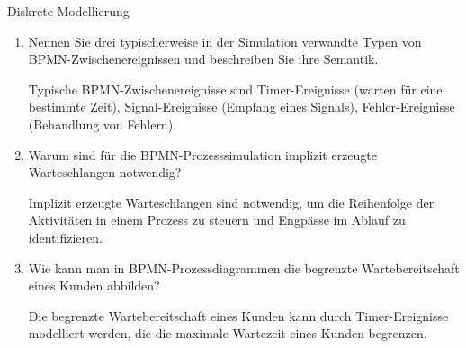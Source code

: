 \documentclass{article}
\begin{document}
\begin{exercise}{Diskrete Modellierung}
\begin{enumerate}
    \item Nennen Sie drei typischerweise in der Simulation verwandte Typen von BPMN-Zwischenereignissen und beschreiben Sie ihre Semantik.
          \begin{solution}
            Typische BPMN-Zwischenereignisse sind Timer-Ereignisse (warten für eine bestimmte Zeit), Signal-Ereignisse (Empfang eines Signals), Fehler-Ereignisse (Behandlung von Fehlern).
          \end{solution}

    \item Warum sind für die BPMN-Prozesssimulation implizit erzeugte Warteschlangen notwendig?
          \begin{solution}
            Implizit erzeugte Warteschlangen sind notwendig, um die Reihenfolge der Aktivitäten in einem Prozess zu steuern und Engpässe im Ablauf zu identifizieren.
          \end{solution}

    \item Wie kann man in BPMN-Prozessdiagrammen die begrenzte Wartebereitschaft eines Kunden abbilden?
          \begin{solution}
            Die begrenzte Wartebereitschaft eines Kunden kann durch Timer-Ereignisse modelliert werden, die die maximale Wartezeit eines Kunden begrenzen.
          \end{solution}
  \end{enumerate}
\end{exercise}
\end{document}
